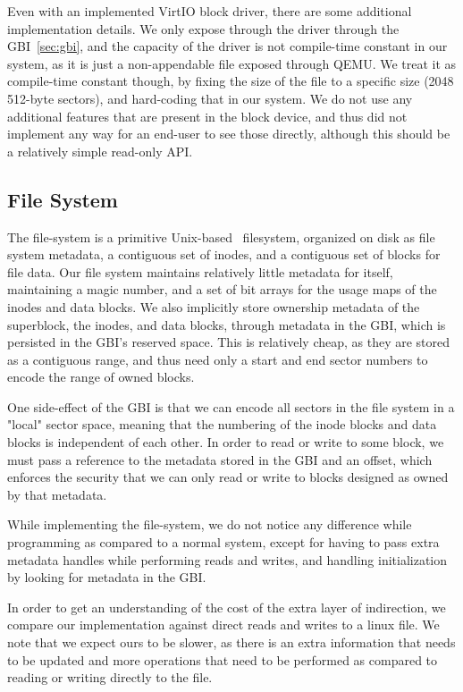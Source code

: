 \documentclass[letterpaper,twocolumn,10pt]{article}
\begin{document}
Even with an implemented VirtIO block driver, there are some additional implementation details.
We only expose through the driver through the GBI~\ref{sec:gbi}, and the capacity of the driver is
not compile-time constant in our system, as it is just a non-appendable file exposed through
QEMU. We treat it as compile-time constant though, by fixing the size of the file to a specific
size (2048 512-byte sectors), and hard-coding that in our system. We do not use any additional
features that are present in the block device, and thus did not implement any way for an
end-user to see those directly, although this should be a relatively simple read-only API.

\subsection{File System}

The file-system is a primitive Unix-based~\cite{unix} filesystem, organized on disk as file
system metadata, a contiguous set of inodes, and a contiguous set of blocks for file data. Our
file system maintains relatively little metadata for itself, maintaining a magic number, and a
set of bit arrays for the usage maps of the inodes and data blocks. We also implicitly store
ownership metadata of the superblock, the inodes, and data blocks, through metadata in the GBI,
which is persisted in the GBI's reserved space. This is relatively cheap, as they are stored as
a contiguous range, and thus need only a start and end sector numbers to encode the range of
owned blocks.

One side-effect of the GBI is that we can encode all sectors in the file system in
a "local" sector space, meaning that the numbering of the inode blocks and data blocks is
independent of each other. In order to read or write to some block, we must pass a reference to
the metadata stored in the GBI and an offset, which enforces the security that we can only read
or write to blocks designed as owned by that metadata.

While implementing the file-system, we do not notice any difference while programming as
compared to a normal system, except for having to pass extra metadata handles while performing
reads and writes, and handling initialization by looking for metadata in the GBI.

In order to get an understanding of the cost of the extra layer of indirection, we compare our
implementation against direct reads and writes to a linux file. We note that we expect ours to
be slower, as there is an extra information that needs to be updated and more operations that
need to be performed as compared to reading or writing directly to the file.
\end{document}
